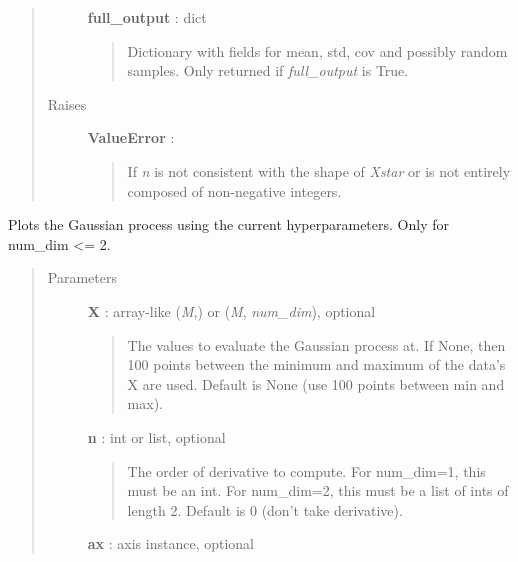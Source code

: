 \documentclass[letterpaper,10pt,english]{sphinxmanual}
\begin{document}
\begin{fulllineitems}
\begin{fulllineitems}
\begin{quote}
\begin{description}
\textbf{full\_output} : dict
\begin{quote}

Dictionary with fields for mean, std, cov and possibly random samples. Only returned if \emph{full\_output} is True.
\end{quote}

\item[{Raises}] \leavevmode
\textbf{ValueError} :
\begin{quote}

If \emph{n} is not consistent with the shape of \emph{Xstar} or is not entirely
composed of non-negative integers.
\end{quote}

\end{description}\end{quote}

\end{fulllineitems}


\begin{fulllineitems}
\label{gptools:gptools.gaussian_process.GaussianProcess.plot}
Plots the Gaussian process using the current hyperparameters. Only for num\_dim \textless{}= 2.
\begin{quote}\begin{description}
\item[{Parameters}] \leavevmode
\textbf{X} : array-like (\emph{M},) or (\emph{M}, \emph{num\_dim}), optional
\begin{quote}

The values to evaluate the Gaussian process at. If None, then 100
points between the minimum and maximum of the data's X are used.
Default is None (use 100 points between min and max).
\end{quote}

\textbf{n} : int or list, optional
\begin{quote}

The order of derivative to compute. For num\_dim=1, this must be an
int. For num\_dim=2, this must be a list of ints of length 2.
Default is 0 (don't take derivative).
\end{quote}

\textbf{ax} : axis instance, optional
\begin{quote}


\end{quote}
\end{description}
\end{quote}
\end{fulllineitems}
\end{fulllineitems}
\end{document}
